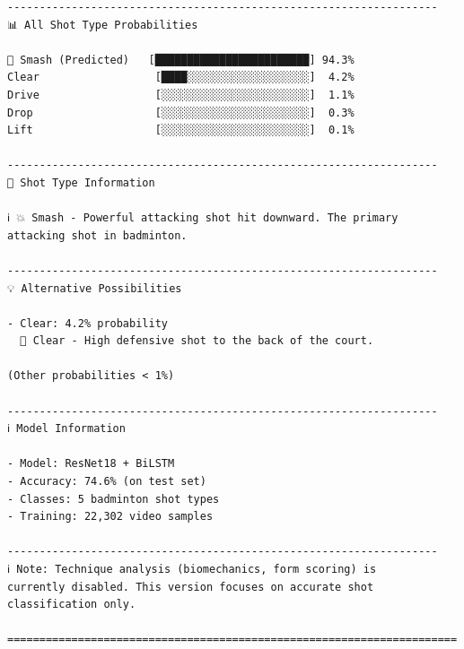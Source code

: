 \documentclass[11pt,a4paper]{article}
\begin{document}
\begin{verbatim}
-------------------------------------------------------------------
📊 All Shot Type Probabilities

🎯 Smash (Predicted)   [████████████████████████] 94.3%
Clear                  [████░░░░░░░░░░░░░░░░░░░]  4.2%
Drive                  [░░░░░░░░░░░░░░░░░░░░░░░]  1.1%
Drop                   [░░░░░░░░░░░░░░░░░░░░░░░]  0.3%
Lift                   [░░░░░░░░░░░░░░░░░░░░░░░]  0.1%

-------------------------------------------------------------------
📖 Shot Type Information

ℹ️ 💥 Smash - Powerful attacking shot hit downward. The primary
attacking shot in badminton.

-------------------------------------------------------------------
💡 Alternative Possibilities

- Clear: 4.2% probability
  🎯 Clear - High defensive shot to the back of the court.

(Other probabilities < 1%)

-------------------------------------------------------------------
ℹ️ Model Information

- Model: ResNet18 + BiLSTM
- Accuracy: 74.6% (on test set)
- Classes: 5 badminton shot types
- Training: 22,302 video samples

-------------------------------------------------------------------
ℹ️ Note: Technique analysis (biomechanics, form scoring) is
currently disabled. This version focuses on accurate shot
classification only.

======================================================================
\end{verbatim}
\end{document}
